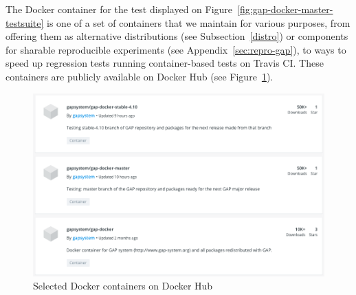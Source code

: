 The Docker container for the test displayed on Figure~\ref{fig:gap-docker-master-testsuite}
is one of a set of containers that we maintain for various purposes, from offering 
them as alternative distributions (see Subsection~\ref{distro}) or components for sharable
reproducible experiments (see Appendix~\ref{sec:repro-gap}), to ways to speed up regression tests running
container-based tests on Travis CI. These containers are publicly available on Docker Hub
(see Figure~\ref{fig:gap-docker}).

\begin{figure}[!ht]
    \centering
    \includegraphics[width=12cm]{images/gap-docker}
    \caption{Selected \GAP Docker containers on Docker Hub}
    \label{fig:gap-docker}
\end{figure}






